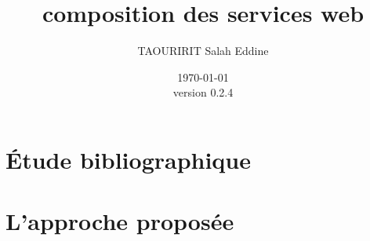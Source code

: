 \documentclass[a4paper, oneside, 12pt]{report}
\author{TAOURIRIT Salah Eddine}
\title{composition des services web}
\date{\today\\version 0.2.4}
\begin{document}
\let\Item\item
\newcommand{\head}[1]{\textnormal{\textbf{#1}}}
\newcommand\SpecialItem{\renewcommand\item[1][]{\Item[\textbullet~\sffamily ##1]}}
\newcommand\SpecialItemi{\renewcommand\item[1][]{\Item[\textendash~\sffamily ##1]}}
\renewcommand\enddescription{\endlist\global\let\item\Item}
\renewcommand{\descriptionlabel}[1]{\hspace{1cm}\textsf{#1}} 
\newtheorem{mydef}{Definition}

\maketitle 

\setcounter{secnumdepth}{4}
\setcounter{tocdepth}{4}

\tableofcontents

\printglossaries
\listoffigures
\listoftables



\part{Étude bibliographique}




\part{L'approche proposée}




\end{document}
